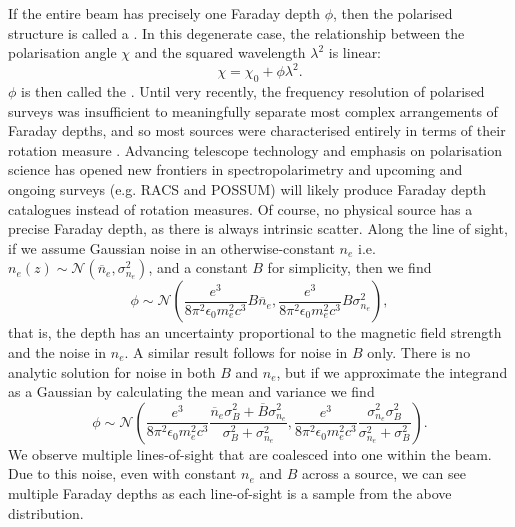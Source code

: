         If the entire beam has precisely one Faraday depth $\phi$, then the polarised structure is called a . In this degenerate case, the relationship between the polarisation angle $\chi$ and the squared wavelength $\lambda^2$ is linear:
        \begin{equation}
            \chi = \chi_0 + \phi \lambda^2.
        \end{equation}
        $\phi$ is then called the . Until very recently, the frequency resolution of polarised surveys was insufficient to meaningfully separate most complex arrangements of Faraday depths, and so most sources were characterised entirely in terms of their rotation measure \citep[e.g.][]{taylor_rotation_2009}. Advancing telescope technology and emphasis on polarisation science has opened new frontiers in spectropolarimetry and upcoming and ongoing surveys (e.g. RACS and POSSUM) will likely produce Faraday depth catalogues instead of rotation measures. Of course, no physical source has a precise Faraday depth, as there is always intrinsic scatter. Along the line of sight, if we assume Gaussian noise in an otherwise-constant $n_e$ i.e. $n_e(z) \sim \mathcal N(\overline n_e, \sigma_{n_e}^2)$, and a constant $B$ for simplicity, then we find
        \begin{equation}
            \phi \sim \mathcal N\left(\frac{e^3}{8\pi^2\epsilon_0m_e^2c^3} B \overline n_e, \frac{e^3}{8\pi^2\epsilon_0m_e^2c^3} B \sigma_{n_e}^2\right),
        \end{equation}
        that is, the depth has an uncertainty proportional to the magnetic field strength and the noise in $n_e$. A similar result follows for noise in $B$ only. There is no analytic solution for noise in both $B$ and $n_e$, but if we approximate the integrand as a Gaussian by calculating the mean and variance we find
        \begin{equation}
            \phi \sim \mathcal N\left(\frac{e^3}{8\pi^2\epsilon_0m_e^2c^3} \frac{\overline n_e \sigma_B^2 + \overline B \sigma_{n_e}^2}{\sigma_B^2 + \sigma_{n_e}^2}, \frac{e^3}{8\pi^2\epsilon_0m_e^2c^3} \frac{\sigma_{n_e}^2 \sigma_B^2}{\sigma_{n_e}^2 + \sigma_B^2}\right).
        \end{equation}
        We observe multiple lines-of-sight that are coalesced into one within the beam. Due to this noise, even with constant $n_e$ and $B$ across a source, we can see multiple Faraday depths as each line-of-sight is a sample from the above distribution.

